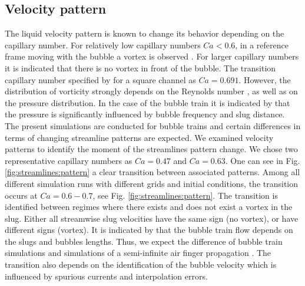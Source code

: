 \documentclass[preprint,12pt]{elsarticle}
\begin{document}
\subsection{Velocity pattern}
\label{sec:velocity}
The liquid velocity pattern is known to change its behavior depending on the capillary number. For
relatively low capillary numbers $Ca<0.6$, in a reference frame moving with the bubble a vortex 
is observed \cite{heil-threedim}. For larger capillary numbers it is indicated that there is no
vortex in front of the bubble. The transition capillary number specified by
\citet{heil-threedim} for a square channel as $Ca=0.691$. However, the
distribution of vorticity strongly depends on the Reynolds number \cite{heil-bretherton}, as well as
on
the
pressure distribution. In the case of the bubble train it is indicated by \citet{kreutzer-taylor}
that the pressure is significantly influenced by bubble frequency and slug distance. The present
simulations are conducted for bubble trains and certain differences in terms of changing streamline
patterns are expected. We examined velocity patterns to identify the moment of the streamlines
pattern change. We chose two
representative capillary numbers as $Ca=0.47$ and $Ca=0.63$. 
One can
see in Fig. \ref{fig:streamlines:pattern} a clear transition between associated patterns. Among all
different simulation runs with different grids and initial conditions, the
transition occurs at $Ca=0.6-0.7$, see Fig. \ref{fig:streamlines:pattern}. The
transition is identified between regimes where there exists and does not exist a vortex in the
slug. Either all streamwise slug velocities have the same sign (no vortex), or have different signs
(vortex). It is indicated by \citet{heil-bretherton,kreutzer-reactors} that the bubble train flow
depends on the slugs and bubbles lengths. Thus, we expect the difference of bubble train simulations
and simulations of a semi-infinite air finger propagation \cite{heil-threedim}. The transition also
depends on the identification of the bubble velocity
which is influenced by spurious currents and interpolation errors.
\end{document}
